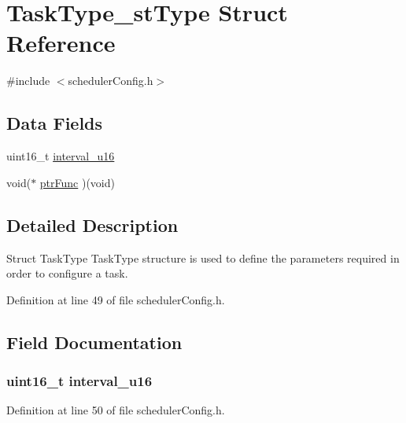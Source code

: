 \hypertarget{struct_task_type__st_type}{}\section{Task\+Type\+\_\+st\+Type Struct Reference}
\label{struct_task_type__st_type}


{\ttfamily \#include $<$scheduler\+Config.\+h$>$}

\subsection*{Data Fields}
\begin{DoxyCompactItemize}
\item 
uint16\+\_\+t \hyperlink{struct_task_type__st_type_aa40544fbcdb815df9f6a9835488e484d}{interval\+\_\+u16}
\item 
void($\ast$ \hyperlink{struct_task_type__st_type_a86cfdbe6606dca2bdfa7ff9b37e9f9be}{ptr\+Func} )(void)
\end{DoxyCompactItemize}


\subsection{Detailed Description}
Struct Task\+Type Task\+Type structure is used to define the parameters required in order to configure a task. 

Definition at line 49 of file scheduler\+Config.\+h.



\subsection{Field Documentation}
\hypertarget{struct_task_type__st_type_aa40544fbcdb815df9f6a9835488e484d}{}
\subsubsection[{interval\+\_\+u16}]{\setlength{\rightskip}{0pt plus 5cm}uint16\+\_\+t interval\+\_\+u16}\label{struct_task_type__st_type_aa40544fbcdb815df9f6a9835488e484d}


Definition at line 50 of file scheduler\+Config.\+h.

\hypertarget{struct_task_type__st_type_a86cfdbe6606dca2bdfa7ff9b37e9f9be}{}
